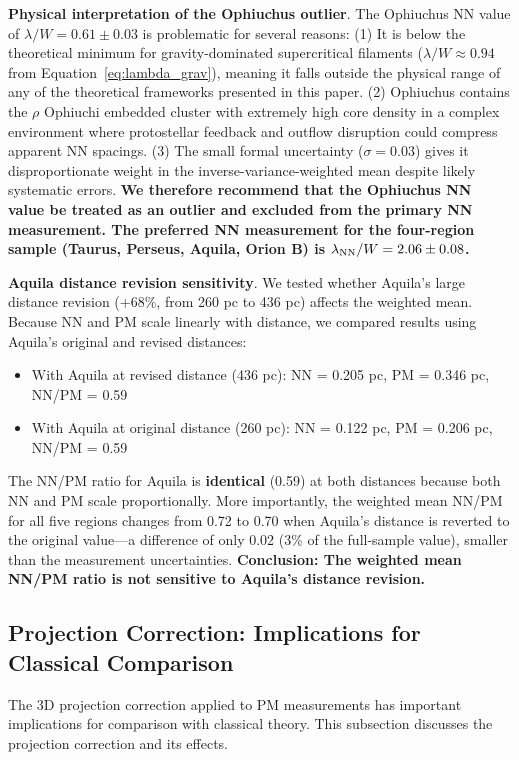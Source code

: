 \documentclass[twoside,twocolumn]{mnras}
\begin{document}
\textbf{Physical interpretation of the Ophiuchus outlier}. The Ophiuchus NN value of $\lambda/W = 0.61 \pm 0.03$ is problematic for several reasons: (1) It is below the theoretical minimum for gravity-dominated supercritical filaments ($\lambda/W \approx 0.94$ from Equation~\ref{eq:lambda_grav}), meaning it falls outside the physical range of any of the theoretical frameworks presented in this paper. (2) Ophiuchus contains the $\rho$ Ophiuchi embedded cluster with extremely high core density in a complex environment where protostellar feedback and outflow disruption could compress apparent NN spacings. (3) The small formal uncertainty ($\sigma = 0.03$) gives it disproportionate weight in the inverse-variance-weighted mean despite likely systematic errors. \textbf{We therefore recommend that the Ophiuchus NN value be treated as an outlier and excluded from the primary NN measurement. The preferred NN measurement for the four-region sample (Taurus, Perseus, Aquila, Orion B) is $\lambda_{\rm NN}/W = 2.06 \pm 0.08$.}

\textbf{Aquila distance revision sensitivity}. We tested whether Aquila's large distance revision (+68\%, from 260 pc to 436 pc) affects the weighted mean. Because NN and PM scale linearly with distance, we compared results using Aquila's original and revised distances:

\begin{itemize}
    \item With Aquila at revised distance (436 pc): NN = 0.205 pc, PM = 0.346 pc, NN/PM = 0.59
    \item With Aquila at original distance (260 pc): NN = 0.122 pc, PM = 0.206 pc, NN/PM = 0.59
\end{itemize}

The NN/PM ratio for Aquila is \textbf{identical} (0.59) at both distances because both NN and PM scale proportionally. More importantly, the weighted mean NN/PM for all five regions changes from 0.72 to 0.70 when Aquila's distance is reverted to the original value---a difference of only 0.02 (3\% of the full-sample value), smaller than the measurement uncertainties. \textbf{Conclusion: The weighted mean NN/PM ratio is not sensitive to Aquila's distance revision.}

\subsection{Projection Correction: Implications for Classical Comparison}

The 3D projection correction applied to PM measurements has important implications for comparison with classical theory. This subsection discusses the projection correction and its effects.
\end{document}
